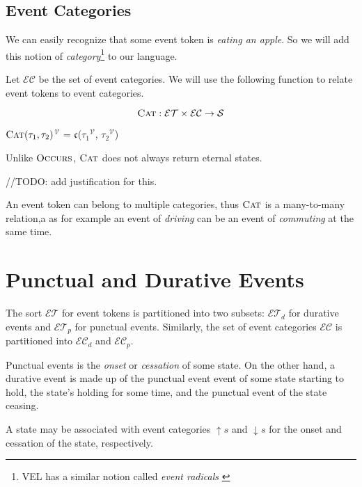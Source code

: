 \subsection{Event Categories}
We can easily recognize that some event token is \textit{eating an apple}. So we will add this notion of \textit{category}\footnote{VEL has a similar notion called \textit{event radicals} \cite{bennett2001unifying}} to our language.

Let $\mathcal{EC}$ be the set of event categories. We will use the following function to relate event tokens to event categories.

\[
    \textsc{Cat}: \mathcal{ET} \times \mathcal{EC} \to \mathcal{S}
\]

\begin{defn}
    \textlbrackdbl $\textsc{Cat}(\tau_1, \tau_2)$\textrbrackdbl$^{\mathcal{V}}$ = $\mathfrak{c}$(\textlbrackdbl $\tau_1$\textrbrackdbl$^{\mathcal{V}}$, \textlbrackdbl $\tau_2$\textrbrackdbl$^{\mathcal{V}}$)
\end{defn}

Unlike $\textsc{Occurs}$, $\textsc{Cat}$ does not always return eternal states.

//TODO: add justification for this.

An event token can belong to multiple categories, thus $\textsc{Cat}$ is a many-to-many relation,a as for example an event of
\textit{driving} can be an event of \textit{commuting} at the same time.

\section{Punctual and Durative Events}

The sort $\mathcal{ET}$ for event tokens is partitioned into two subsets: $\mathcal{ET}_d$ for durative events and $\mathcal{ET}_p$ for punctual events.
Similarly, the set of event categories $\mathcal{EC}$ is partitioned into $\mathcal{EC}_d$ and $\mathcal{EC}_p$.

Punctual events is the \textit{onset} or \textit{cessation} of some state. On the other hand, a durative event is made up
of the punctual event event of some state starting to hold, the state's holding for some time, and the punctual event of the state ceasing.

A state may be associated with event categories $\uparrow s$ and $\downarrow s$ for the onset and cessation of the state, respectively.

